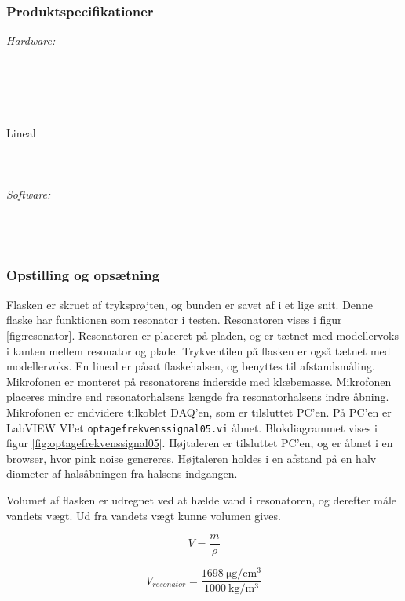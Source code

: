 	\subsubsection{Produktspecifikationer}
	\textit{Hardware:}\\
	\\
	\elektretto\\
	\daq\\
	\\	
	\snot\\	
	Lineal\\
	\modellervoks\\
	\plade\\
	\PC\\
	
	\textit{Software:}\\
	\labview\\
	\daqsoft\\
	\onlineg\\
	
	\subsubsection{Opstilling og opsætning}
	Flasken er skruet af tryksprøjten, og bunden er savet af i et lige snit. Denne flaske har funktionen som resonator i testen. Resonatoren vises i figur \ref{fig:resonator}. Resonatoren er placeret på pladen, og er tætnet med modellervoks i kanten mellem resonator og plade. Trykventilen på flasken er også tætnet med modellervoks. En lineal er påsat flaskehalsen, og benyttes til afstandsmåling. Mikrofonen er monteret på resonatorens inderside med klæbemasse. Mikrofonen placeres mindre end resonatorhalsens længde fra  resonatorhalsens indre åbning. Mikrofonen er endvidere tilkoblet DAQ'en, som er tilsluttet PC'en. På PC'en er LabVIEW VI'et \texttt{optagefrekvenssignal05.vi} åbnet. Blokdiagrammet vises i figur \ref{fig:optagefrekvenssignal05}. Højtaleren er tilsluttet PC'en, og \onlineg er åbnet i en browser, hvor pink noise genereres. Højtaleren holdes i en afstand på en halv diameter af halsåbningen fra halsens indgangen.  
	
Volumet af flasken er udregnet ved at hælde vand i resonatoren, og derefter måle vandets vægt. Ud fra vandets vægt kunne volumen gives. 

\begin{equation}
  V=\frac{m}{\rho}
  \label{eq:vformel}
\end{equation}

\begin{equation}
V_{resonator}=\frac{\SI{1698}{\micro\gram \per \centi\meter^{3}}}{\SI{1000}{\kilo \gram \per \meter^{3}}}
\end{equation}

